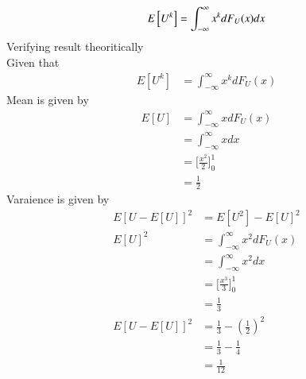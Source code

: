 \documentclass[journal,12pt,twocolumn]{IEEEtran}
\begin{document}
%
\begin{equation}
E{}\left[U^k\right] = \int_{-\infty}^{\infty}x^kdF_{U}(x)dx
\end{equation}
\solution Verifying result theoritically\\
Given that
\begin{align}
    E[U^k] &= \int_{-\infty}^{\infty} x^k dF_U(x)
\end{align}
Mean is given by
\begin{align}
    E[U] &= \int_{-\infty}^{\infty} x dF_U(x) \\
    &= \int_{-\infty}^{\infty} x dx \\
    &= \bigg[\frac{x^2}{2}\bigg]_0^1 \\
    &= \frac{1}{2}
\end{align}
Varaience is given by
\begin{align}
    E[U-E[U]]^2 &= E[U^2] - E[U]^2 \\
    E[U]^2 &= \int_{-\infty}^{\infty} x^2 dF_U(x)\\
    &= \int_{-\infty}^{\infty} x^2 dx \\
    &= \bigg[\frac{x^3}{3}\bigg]_0^1 \\
    &= \frac{1}{3} \\
    E[U-E[U]]^2 &= \frac{1}{3} - (\frac{1}{2})^2 \\
    &= \frac{1}{3} - \frac{1}{4} \\
    &= \frac{1}{12}
\end{align}
\end{document}
